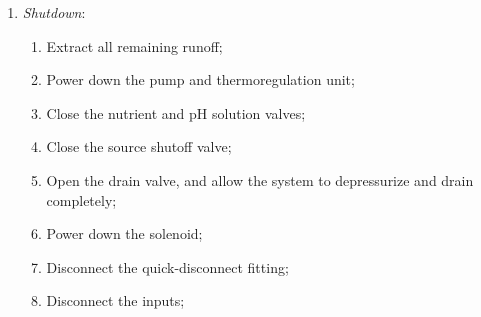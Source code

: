 \documentclass{../tex/report}
\begin{document}
\begin{enumerate}
\begin{enumerate}
        \item Nutrient and pH (\ref{sec:nutrientsph}) solutions are mixed in-line at an adjustable ratio (\ref{sec:automation}); \footnote{I.e. add X mL of nutrient solution Y per mL water to achieve Z ppm, or add A mL of pH down solution per mL water to achieve a pH of B.}
        \item Flow to nozzle is controlled (on/off) (\ref{sec:automation});
        \item Nozzle turns pressurized water into mist, which is 98\% more water efficient than traditional farming;
        \item Mist runoff is contained by a container, and extracted for processing as waste water;
    \end{enumerate}
    \item \textit{Shutdown}:
    \begin{enumerate}
        \item Extract all remaining runoff;
        \item Power down the pump and thermoregulation unit;
        \item Close the nutrient and pH solution valves;
        \item Close the source shutoff valve;
        \item Open the drain valve, and allow the system to depressurize and  drain completely;
        \item Power down the solenoid;
        \item Disconnect the quick-disconnect fitting;
        \item Disconnect the inputs;
    \end{enumerate}
\end{enumerate}
\end{document}
